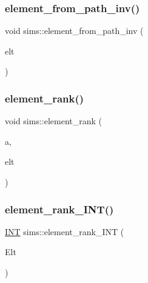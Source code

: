 \mbox{\label{classsims_affad99d2bb7ef403201daefaeccb4f79}} 
\subsubsection{\texorpdfstring{element\+\_\+from\+\_\+path\+\_\+inv()}{element\_from\_path\_inv()}}
{\footnotesize\ttfamily void sims\+::element\+\_\+from\+\_\+path\+\_\+inv (\begin{DoxyParamCaption}\item[{\mbox{\hyperlink{galois_8h_a09fddde158a3a20bd2dcadb609de11dc}{I\+NT}} $\ast$}]{elt }\end{DoxyParamCaption})}

\mbox{\label{classsims_a00fb332192d01becb17b6a059482fc8d}} 
\subsubsection{\texorpdfstring{element\+\_\+rank()}{element\_rank()}}
{\footnotesize\ttfamily void sims\+::element\+\_\+rank (\begin{DoxyParamCaption}\item[{\mbox{\hyperlink{classlonginteger__object}{longinteger\+\_\+object}} \&}]{a,  }\item[{\mbox{\hyperlink{galois_8h_a09fddde158a3a20bd2dcadb609de11dc}{I\+NT}} $\ast$}]{elt }\end{DoxyParamCaption})}

\mbox{\label{classsims_a8ff29017c518c9ed459a7ea9eade2974}} 
\subsubsection{\texorpdfstring{element\+\_\+rank\+\_\+\+I\+N\+T()}{element\_rank\_INT()}}
{\footnotesize\ttfamily \mbox{\hyperlink{galois_8h_a09fddde158a3a20bd2dcadb609de11dc}{I\+NT}} sims\+::element\+\_\+rank\+\_\+\+I\+NT (\begin{DoxyParamCaption}\item[{\mbox{\hyperlink{galois_8h_a09fddde158a3a20bd2dcadb609de11dc}{I\+NT}} $\ast$}]{Elt }\end{DoxyParamCaption})}

